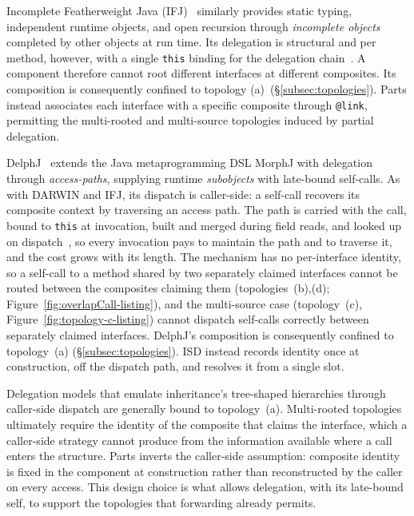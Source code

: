 \documentclass[acmsmall,nonacm]{acmart}
\theoremstyle{acmplain}
\newcommand{\code}[1]{\texttt{#1}}
\begin{document}
Incomplete Featherweight Java (IFJ)~\cite{bettini2011} similarly provides
static typing, independent runtime objects, and open recursion through
\emph{incomplete objects} completed by other objects at run time. Its
delegation is structural and per method, however, with a single \code{this}
binding for the delegation chain~\cite[\S1, Fig.~1]{bettini2011}. A component
therefore cannot root different interfaces at different composites. Its
composition is consequently confined to topology (a)~(\S\ref{subsec:topologies}).
Parts instead associates each interface with a specific composite through
\code{@link}, permitting the multi-rooted and multi-source topologies induced
by partial delegation.

DelphJ~\cite{gerakios2013} extends the Java metaprogramming DSL MorphJ with
delegation through \emph{access-paths}, supplying runtime \emph{subobjects} with
late-bound self-calls. As with DARWIN and IFJ, its dispatch is caller-side: a
self-call recovers its composite context by traversing an access path. The path
is carried with the call, bound to \code{this} at invocation, built and merged
during field reads, and looked up on dispatch~\cite[\S3]{gerakios2013}, so every
invocation pays to maintain the path and to traverse it, and the cost grows with
its length. The mechanism has no per-interface identity, so a self-call to a
method shared by two separately claimed interfaces cannot be routed between the
composites claiming them (topologies~(b),(d); Figure~\ref{fig:overlapCall-listing}),
and the multi-source case (topology~(c), Figure~\ref{fig:topology-c-listing})
cannot dispatch self-calls correctly between separately claimed interfaces.
DelphJ's composition is consequently confined to topology~(a) (\S\ref{subsec:topologies}).
ISD instead records identity once at construction, off the dispatch path, and
resolves it from a single slot.

Delegation models that emulate inheritance's tree-shaped hierarchies through caller-side dispatch are generally bound to
topology~(a). Multi-rooted topologies ultimately require the identity of the composite that claims the interface,
which a caller-side strategy cannot produce from the information available where a call enters the structure. Parts inverts
the caller-side assumption: composite identity is fixed in the component at construction rather than reconstructed by the
caller on every access. This design choice is what allows delegation, with its late-bound self, to support the topologies
that forwarding already permits.
\end{document}
